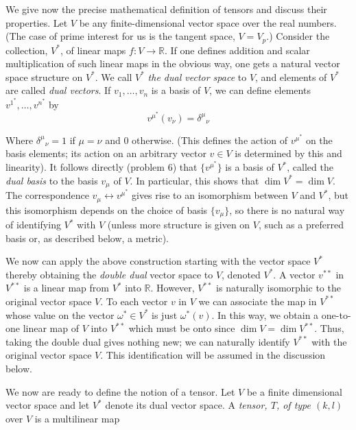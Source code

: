 We give now the precise mathematical definition of tensors and discuss their properties. Let $V$ be any finite-dimensional vector space over the real numbers. (The case of prime interest for us is the tangent space, $V=V_p$.) Consider the collection, $V^*$, of linear maps $f:V\to\mathbb{R}$. If one defines addition and scalar multiplication of such linear maps in the obvious way, one gets a natural vector space structure on $V^*$. We call $V^*$ \emph{the dual vector space} to $V$, and elements of $V^*$ are called \emph{dual vectors}. If $v_1,\ldots,v_n$ is a basis of $V$, we can define elements $v^{1^*},\ldots,v^{n^*}$ by
\begin{equation}
    v^{\mu^*}(v_\nu)={\delta^\mu}_\nu
    \label{2.3.1}
\end{equation}

Where ${\delta^\mu}_\nu=1$ if $\mu=\nu$ and $0$ otherwise. (This defines the action of $v^{\mu^*}$ on the basis elements; its action on an arbitrary vector $v\in V$ is determined by this and linearity). It follows directly (problem 6) that $\{v^{\mu^*}\}$ is a basis of $V^*$, called the \emph{dual basis} to the basis ${v_\mu}$ of $V$. In particular, this shows that $\dim V^* = \dim V$. The correspondence $v_\mu\leftrightarrow v^{\mu^*}$ gives rise to an isomorphism between $V$ and $V^*$, but this isomorphism depends on the choice of basis $\{v_\mu\}$, so there is no natural way of identifying $V^*$ with $V$ (unless more structure is given on $V$, such as a preferred basis or, as described below, a metric).

We now can apply the above construction starting with the vector space $V^*$ thereby obtaining the \emph{double dual} vector space to $V$, denoted $V^*$. A vector $v^{**}$ in $V^{**}$ is a linear map from $V^*$ into $\mathbb{R}$. However, $V^{**}$ is naturally isomorphic to the original vector space $V$. To each vector $v$ in $V$ we can associate the map in $V^{**}$ whose value on the vector $\omega^*\in V^*$ is just $\omega^*(v)$. In this way, we obtain a one-to-one linear map of $V$ into $V^{**}$ which must be onto since $\dim V = \dim V^{**}$. Thus, taking the double dual gives nothing new; we can naturally identify $V^{**}$ with the original vector space $V$. This identification will be assumed in the discussion below.

We now are ready to define the notion of a tensor. Let $V$ be a finite dimensional vector space and let $V^*$ denote its dual vector space. A \emph{tensor, $T$, of type $(k,l)$} over $V$ is a multilinear map

